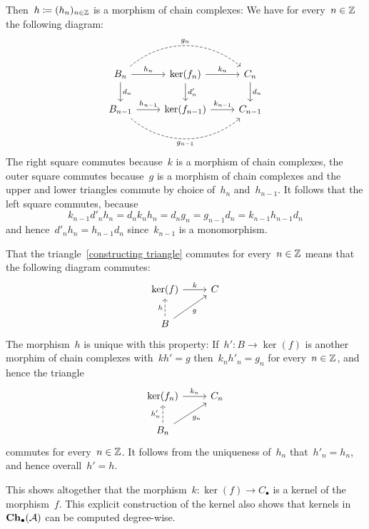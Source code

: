 Then~$h \coloneqq (h_n)_{n \in \mathbb{Z}}$ is a morphism of chain complexes: We have for every~$n \in \mathbb{Z}$ the following diagram:
\begin{equation}
  \label{cheese block}
  \begin{tikzcd}
      B_n
      \arrow[dashed, bend left = 40]{rr}[above]{g_n}
      \arrow{r}[above]{h_n}
      \arrow{d}[right]{d_n}
    & \ker(f_n)
      \arrow{r}[above]{k_n}
      \arrow{d}[right]{d'_n}
    & C_n
      \arrow{d}[right]{d_n}
    \\
      B_{n-1}
      \arrow{r}[above]{h_{n-1}}
      \arrow[dashed, bend right = 40]{rr}[below]{g_{n-1}}
    & \ker(f_{n-1})
      \arrow{r}[above]{k_{n-1}}
    & C_{n-1}
  \end{tikzcd}
\end{equation}
The right square commutes because~$k$ is a morphism of chain complexes, the outer square commutes because~$g$ is a morphism of chain complexes and the upper and lower triangles commute by choice of~$h_n$ and~$h_{n-1}$.
It follows that the left square commutes, because
\[
    k_{n-1} d'_n h_n
  = d_n k_n h_n
  = d_n g_n
  = g_{n-1} d_n
  = k_{n-1} h_{n-1} d_n
\]
and hence~$d'_n h_n = h_{n-1} d_n$ since~$k_{n-1}$ is a monomorphism.

That the triangle~\eqref{constructing triangle} commutes for every~$n \in \mathbb{Z}$ means that the following diagram commutes:
\[
  \begin{tikzcd}
      \ker(f)
      \arrow{r}[above]{k}
    & C
    \\
      B
      \arrow[dashed]{u}[left]{h}
      \arrow{ur}[below right]{g}
    & {}
  \end{tikzcd}
\]
The morphism~$h$ is unique with this property:
If~$h' \colon B \to \ker(f)$ is another morphim of chain complexes with~$k h' = g$ then~$k_n h'_n = g_n$ for every~$n \in \mathbb{Z}$, and hence the triangle
\[
  \begin{tikzcd}
      \ker(f_n)
      \arrow{r}[above]{k_n}
    & C_n
    \\
      B_n
      \arrow[dashed]{u}[left]{h'_n}
      \arrow{ur}[below right]{g_n}
    & {}
  \end{tikzcd}
\]
commutes for every~$n \in \mathbb{Z}$.
It follows from the uniqueness of~$h_n$ that~$h'_n = h_n$, and hence overall~$h' = h$.

This shows altogether that the morphism~$k \colon \ker(f) \to C_\bullet$ is a kernel of the morphism~$f$.
This explicit construction of the kernel also shows that kernels in~$\mathbf{Ch}_\bullet(\mathcal{A})$ can be computed degree-wise.

